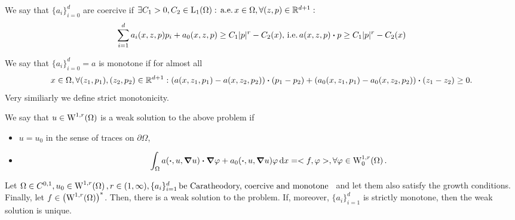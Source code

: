 \documentclass{article}
\begin{document}
	\begin{definition}[Coercivity]
	We say that $\{a_i\}_{i=0}^d$ are coercive if $\exists C_1 > 0, C_2 \in \LpSet[1]{\Omega}: \, \text{a.e.} \, x \in \Omega, \forall (z,p) \in \R^{d+1}:$
	\[
		\sum_{i=1}^d a_i\qty(x,z,p)p_i + a_0\qty(x,z,p) \geq C_1 |p|^r-C_2(x), \, \text{i.e.} \, a\qty(x,z,p) \vdot p \geq C_1 |p|^r - C_2(x)
	\]
\end{definition}

\begin{definition}[Monotonicity]
	We say that $\{a_i\}_{i=0}^d = a$ is monotone if for almost all
	\[
		x \in \Omega, \forall (z_1,p_1), (z_2,p_2) \in \R^{d+1}: \qty(a\qty(x,z_1,p_1)-a\qty(x,z_2,p_2))\vdot (p_1 - p_2) + (a_0\qty(x,z_1,p_1)-a_0\qty(x,z_2,p_2))\vdot (z_1 - z_2) \geq 0.
	\]
	Very similiarly we define strict monotonicity.
\end{definition}

\begin{definition}
    We say that $u \in \WkpSet[1][r]{\Omega}$ is a weak solution to the above problem if
    \begin{itemize}
	    \item $u = u_0$ in the sense of traces on $\partial \Omega$,
	\item
		\[
			\int_{\Omega}a\qty(\vdot, u, \grad u)\vdot \grad \varphi +a_0\qty(\vdot, u, \grad u) \varphi \dd{x} = <f,\varphi>, \forall \varphi \in \WkpzeroSet[1][r]{\Omega}.
		\]
    \end{itemize}
\end{definition}

\begin{theorem}
	Let $\Omega \in C^{0,1}, u_0 \in \WkpSet[1][r]{\Omega}, r \in (1,\infty), \{a_i\}_{i=1}^d \, \text{be Caratheodory, coercive and monotone } \,$ and let them also satisfy the growth conditions. Finally, let $f \in \qty(\WkpSet[1][r]{\Omega})^{*}$. Then, there is a weak solution to the problem.
	If, moreover, $\{a_i\}_{i=1}^d$ is strictly monotone, then the weak solution is unique.
\end{theorem}
\end{document}

